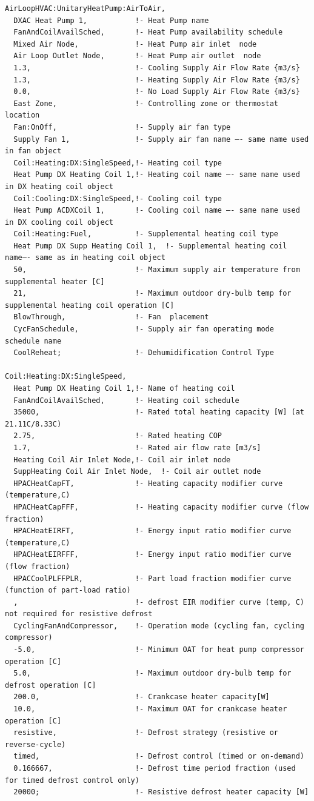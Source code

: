\begin{lstlisting}
AirLoopHVAC:UnitaryHeatPump:AirToAir,
  DXAC Heat Pump 1,           !- Heat Pump name
  FanAndCoilAvailSched,       !- Heat Pump availability schedule
  Mixed Air Node,             !- Heat Pump air inlet  node
  Air Loop Outlet Node,       !- Heat Pump air outlet  node
  1.3,                        !- Cooling Supply Air Flow Rate {m3/s}
  1.3,                        !- Heating Supply Air Flow Rate {m3/s}
  0.0,                        !- No Load Supply Air Flow Rate {m3/s}
  East Zone,                  !- Controlling zone or thermostat location
  Fan:OnOff,                  !- Supply air fan type
  Supply Fan 1,               !- Supply air fan name –- same name used in fan object
  Coil:Heating:DX:SingleSpeed,!- Heating coil type
  Heat Pump DX Heating Coil 1,!- Heating coil name –- same name used in DX heating coil object
  Coil:Cooling:DX:SingleSpeed,!- Cooling coil type
  Heat Pump ACDXCoil 1,       !- Cooling coil name –- same name used in DX cooling coil object
  Coil:Heating:Fuel,          !- Supplemental heating coil type
  Heat Pump DX Supp Heating Coil 1,  !- Supplemental heating coil name–- same as in heating coil object
  50,                         !- Maximum supply air temperature from supplemental heater [C]
  21,                         !- Maximum outdoor dry-bulb temp for supplemental heating coil operation [C]
  BlowThrough,                !- Fan  placement
  CycFanSchedule,             !- Supply air fan operating mode schedule name
  CoolReheat;                 !- Dehumidification Control Type

Coil:Heating:DX:SingleSpeed,
  Heat Pump DX Heating Coil 1,!- Name of heating coil
  FanAndCoilAvailSched,       !- Heating coil schedule
  35000,                      !- Rated total heating capacity [W] (at 21.11C/8.33C)
  2.75,                       !- Rated heating COP
  1.7,                        !- Rated air flow rate [m3/s]
  Heating Coil Air Inlet Node,!- Coil air inlet node
  SuppHeating Coil Air Inlet Node,  !- Coil air outlet node
  HPACHeatCapFT,              !- Heating capacity modifier curve (temperature,C)
  HPACHeatCapFFF,             !- Heating capacity modifier curve (flow fraction)
  HPACHeatEIRFT,              !- Energy input ratio modifier curve (temperature,C)
  HPACHeatEIRFFF,             !- Energy input ratio modifier curve (flow fraction)
  HPACCoolPLFFPLR,            !- Part load fraction modifier curve (function of part-load ratio)
  ,                           !- defrost EIR modifier curve (temp, C) not required for resistive defrost
  CyclingFanAndCompressor,    !- Operation mode (cycling fan, cycling compressor)
  -5.0,                       !- Minimum OAT for heat pump compressor operation [C]
  5.0,                        !- Maximum outdoor dry-bulb temp for defrost operation [C]
  200.0,                      !- Crankcase heater capacity[W]
  10.0,                       !- Maximum OAT for crankcase heater operation [C]
  resistive,                  !- Defrost strategy (resistive or reverse-cycle)
  timed,                      !- Defrost control (timed or on-demand)
  0.166667,                   !- Defrost time period fraction (used for timed defrost control only)
  20000;                      !- Resistive defrost heater capacity [W]


\end{lstlisting}
